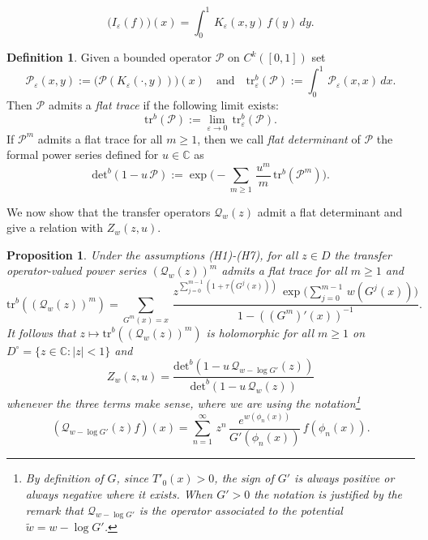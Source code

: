 \documentclass[11pt]{amsart}
\newtheorem{proposition}[theorem]{Proposition}
\theoremstyle{definition}
\newtheorem{definition}[theorem]{Definition}
\theoremstyle{remark}
\theoremstyle{definition}
\numberwithin{equation}{section}
\newcommand{\C}{\mathbb C}
\newcommand{\eps}{\varepsilon}
\newcommand{\PP}{\mathcal{P}}
\newcommand{\QQ}{\mathcal{Q}}
\newcommand{\flattr}{\text{tr}^b}
\newcommand{\flatdet}{\text{det}^b}
\begin{document}
\[
\Big(I_\eps(f)\Big)(x) = \int_0^1\, K_\eps(x,y)\, f(y)\, dy.
\]
\begin{definition}\label{def:flat-things}
Given a bounded operator $\PP$ on $C^k([0,1])$ set
\[
\PP_\eps(x,y) := \Big(\PP (K_\eps(\cdot,y))\Big)(x) \quad \text{and} \quad  \flattr_\eps(\PP) := \int_0^1\, \PP_\eps(x,x)\, dx.
\]
Then $\PP$ admits a \emph{flat trace} if the following limit exists:
\[
\flattr(\PP) := \lim_{\eps \to 0}\, \flattr_\eps(\PP).
\]
If $\PP^m$ admits a flat trace for all $m\ge 1$, then we call \emph{flat determinant} of $\PP$ the formal power series defined for $u\in \C$ as 
\begin{equation} \label{flat-det}
\flatdet(1-u\,\PP) := \exp\Big( -\sum_{m\ge 1}\, \frac{u^m}m\, \flattr(\PP^m) \Big).
\end{equation}
\end{definition}

We now show that the transfer operators $\QQ_w(z)$ admit a flat determinant and give a relation with $Z_w(z,u)$.

\begin{proposition}\label{prop:q-flat}
Under the assumptions (H1)-(H7), for all $z\in D$ the transfer operator-valued power series $(\QQ_w(z))^m$ admits a flat trace for all $m\ge 1$ and
\[
\flattr((\QQ_w(z))^m) = \sum_{G^m(x)=x}\, \frac{z^{\sum_{j=0}^{m-1} (1+\tau(G^j(x)))} \, \exp\Big(\sum_{j=0}^{m-1}\, w(G^j(x))\Big)}{1-((G^m)'(x))^{-1}}.
\]
It follows that {$z\mapsto \flattr((\QQ_w(z))^m)$ is holomorphic for all $m\ge 1$ on $D^\circ =\{z\in \C: |z|<1\}$ and}
\begin{equation}\label{Z-flatdet}
Z_w(z,u) = \frac{\flatdet(1-u\, \QQ_{w-\log G'}(z))}{\flatdet(1-u\, \QQ_{w}(z))}
\end{equation}
whenever the three terms make sense, where we are using the notation\footnote{By definition of $G$, since $T'_0(x)>0$, the sign of $G'$ is always positive or always negative where it exists. When $G'>0$ the notation is justified by the remark that $\QQ_{w-\log G'}$ is the operator associated to the potential $\tilde w = w-\log G'$.}
\begin{equation} \label{q-w-log}
(\QQ_{w-\log G'}(z)f) (x) = \sum_{n=1}^\infty\, z^n\, \frac{e^{w(\phi_n(x))}}{G'(\phi_n(x))}\,  f(\phi_n(x)).
\end{equation}
\end{proposition}
\end{document}
